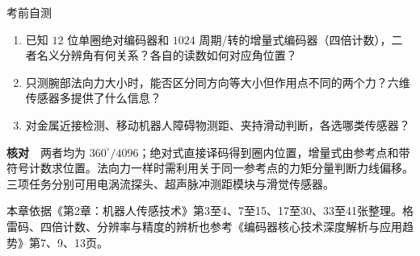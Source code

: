 \begin{focusbox}{考前自测}
\begin{enumerate}
\item 已知 $12$ 位单圈绝对编码器和 $1024$ 周期/转的增量式编码器（四倍计数），二者名义分辨角有何关系？各自的读数如何对应角位置？
\item 只测腕部法向力大小时，能否区分同方向等大小但作用点不同的两个力？六维传感器多提供了什么信息？
\item 对金属近接检测、移动机器人障碍物测距、夹持滑动判断，各选哪类传感器？
\end{enumerate}
\textbf{核对}　两者均为 $360^\circ/4096$；绝对式直接译码得到圈内位置，增量式由参考点和带符号计数求位置。法向力一样时需利用关于同一参考点的力矩分量判断力线偏移。三项任务分别可用电涡流探头、超声脉冲测距模块与滑觉传感器。
\end{focusbox}

{\small 本章依据《第2章：机器人传感技术》第3至4、7至15、17至30、33至41张整理。格雷码、四倍计数、分辨率与精度的辨析也参考《编码器核心技术深度解析与应用趋势》第7、9、13页。}
